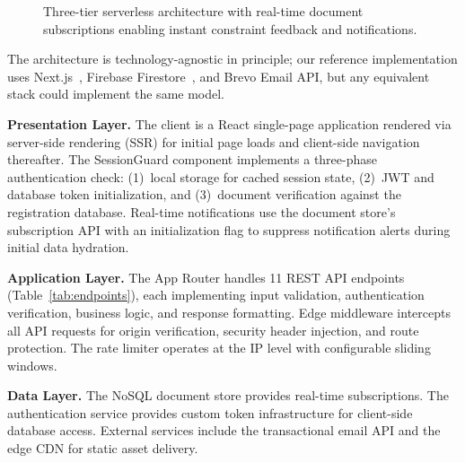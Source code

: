 \documentclass[11pt,a4paper]{article}
\theoremstyle{plain}
\theoremstyle{definition}
\theoremstyle{remark}
\begin{document}
\begin{figure}[htbp]
{}%

\caption{Three-tier serverless architecture with real-time document subscriptions enabling instant constraint feedback and notifications.}
\label{fig:architecture}
\end{figure}

The architecture is technology-agnostic in principle; our reference implementation uses Next.js~\cite{nextjs}, Firebase Firestore~\cite{firebase}, and Brevo Email API, but any equivalent stack could implement the same model.

\textbf{Presentation Layer.} The client is a React single-page application rendered via server-side rendering (SSR) for initial page loads and client-side navigation thereafter. The SessionGuard component implements a three-phase authentication check: (1)~local storage for cached session state, (2)~JWT and database token initialization, and (3)~document verification against the registration database. Real-time notifications use the document store's subscription API with an initialization flag to suppress notification alerts during initial data hydration.

\textbf{Application Layer.} The App Router handles 11 REST API endpoints (Table~\ref{tab:endpoints}), each implementing input validation, authentication verification, business logic, and response formatting. Edge middleware intercepts all API requests for origin verification, security header injection, and route protection. The rate limiter operates at the IP level with configurable sliding windows.

\textbf{Data Layer.} The NoSQL document store provides real-time subscriptions. The authentication service provides custom token infrastructure for client-side database access. External services include the transactional email API and the edge CDN for static asset delivery.
\end{document}
